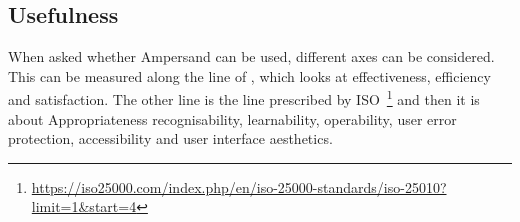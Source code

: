 

\begin{comment}
Herkenbaarheid van geschiktheid (Appropriateness recognisability)
    De mate waarin gebruikers kunnen herkennen of een product of systeem geschikt is voor hun behoeften.
Leerbaarheid (Learnability)
    De mate waarin een product of systeem gebruikt kan worden door gespecificeerde gebruikers om gespecificeerde leerdoelen te bereiken met betrekking tot het gebruik van het product of systeem met effectiviteit, efficiëntie, vrijheid van risico en voldoening, in een gespecificeerde gebruikscontext.
Bedienbaarheid (Operability)
    De mate waarin een product of systeem attributen heeft die het makkelijk maken om het te bedienen en beheersen.
Voorkomen gebruikersfouten (User error protection)
    De mate waarin het systeem gebruikers beschermt tegen het maken van fouten.
Volmaaktheid gebruikersinteractie (User interface aesthetics)
    De mate waarin een gebruikersinterface het de gebruiker mogelijk maakt om een plezierige en voldoening gevende interactie te hebben.
Toegankelijkheid (Accessibility)
    De mate waarin een product of systeem gebruikt kan worden door mensen met de meest uiteenlopende eigenschappen en mogelijkheden om een gespecificeerd doel te bereiken in een gespecificeerde gebruikscontext.
\end{comment}


\subsection{Usefulness} \label{useful}
\def\cat{1}

When asked whether Ampersand can be used, different axes can be considered.
This can be measured along the line of \cite{HORNBAEK200679}, which looks at effectiveness, efficiency and satisfaction.
The other line is the line prescribed by ISO~\footnote{\url{https://iso25000.com/index.php/en/iso-25000-standards/iso-25010?limit=1&start=4}} and then it is about Appropriateness recognisability, learnability, operability, user error protection, accessibility and user interface aesthetics.

